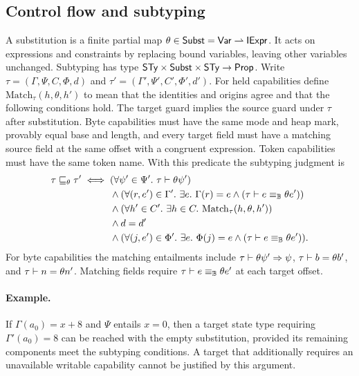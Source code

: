 \subsection{Control flow and subtyping}
\begin{definition}\label{def:subtype}
A substitution is a finite partial map $\theta\in\mathsf{Subst}=\mathsf{Var}\rightharpoonup\mathsf{IExpr}$. It acts on expressions and constraints by replacing bound variables, leaving other variables unchanged. Subtyping has type $\mathsf{STy}\times\mathsf{Subst}\times\mathsf{STy}\to\mathsf{Prop}$. Write $\tau=(\Gamma,\Psi,C,\Phi,d)$ and $\tau'=(\Gamma',\Psi',C',\Phi',d')$. For held capabilities define $\mathrm{Match}_\tau(h,\theta,h')$ to mean that the identities and origins agree and that the following conditions hold. The target guard implies the source guard under $\tau$ after substitution. Byte capabilities must have the same mode and heap mark, provably equal base and length, and every target field must have a matching source field at the same offset with a congruent expression. Token capabilities must have the same token name. With this predicate the subtyping judgment is
\[
\begin{aligned}
\tau\sub{\theta}\tau'\iff{}& (\forall\psi'\in\Psi'.\ \tau\ent\theta\psi')\\
&\land(\forall(r,e')\in\Gamma'.\ \exists e.\ \Gamma(r)=e\land(\tau\ent e\eqB\theta e'))\\
&\land(\forall h'\in C'.\ \exists h\in C.\ \mathrm{Match}_\tau(h,\theta,h'))\\
&\land d=d'\\
&\land(\forall(j,e')\in\Phi'.\ \exists e.\ \Phi(j)=e\land(\tau\ent e\eqB\theta e')).
\end{aligned}
\]
For byte capabilities the matching entailments include $\tau\vdash\theta\psi'\Rightarrow\psi$, $\tau\vdash b=\theta b'$, and $\tau\vdash n=\theta n'$. Matching fields require $\tau\vdash e\equiv_{\mathbb{B}}\theta e'$ at each target offset.
\end{definition}

\paragraph{Example.} If $\Gamma(a_0)=x+8$ and $\Psi$ entails $x=0$, then a target state type requiring $\Gamma'(a_0)=8$ can be reached with the empty substitution, provided its remaining components meet the subtyping conditions. A target that additionally requires an unavailable writable capability cannot be justified by this argument.


